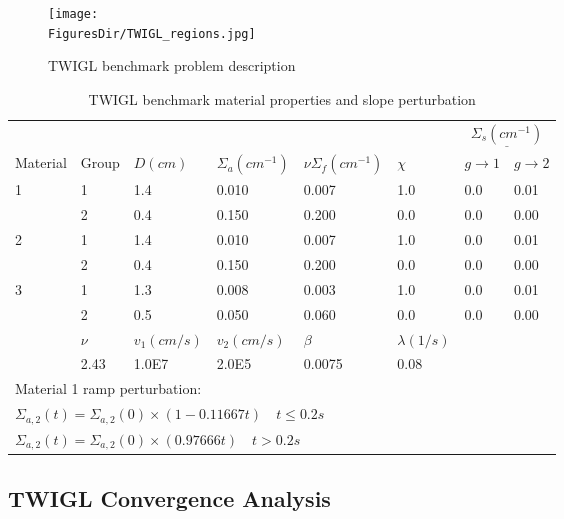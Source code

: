 \begin{figure}[!htbp]
\begin{center}
\texttt{[image: \\FiguresDir/TWIGL\_regions.jpg]}
\caption{TWIGL benchmark problem description}
\label{fig:TWIGL_reg}
\end{center}
\end{figure}
\begin{table}[!htbp]
\begin{center}
\caption{TWIGL benchmark material properties and slope perturbation}
\label{tab:TWIGL_mat}
\begin{tabular}{llllllll}
\hline
  &  &  &  &  &  &  \multicolumn{2}{c}{$\underline{\Sigma_s (cm^{-1})} $} \\
Material & Group & $D (cm)$ & $\Sigma_a (cm^{-1})$ & $\nu\Sigma_f (cm^{-1})$ & $\chi$ & $g \rightarrow 1$ & $g \rightarrow 2$ \\
\hline
1 & 1 & 1.4 & 0.010 & 0.007 & 1.0 & 0.0 & 0.01 \\
  & 2 & 0.4 & 0.150 & 0.200 & 0.0 & 0.0 & 0.00  \\
2 & 1 & 1.4 & 0.010 & 0.007 & 1.0 & 0.0 & 0.01  \\
  & 2 & 0.4 & 0.150 & 0.200 & 0.0 & 0.0 & 0.00  \\
3 & 1 & 1.3 & 0.008 & 0.003 & 1.0 & 0.0 & 0.01  \\
  & 2 & 0.5 & 0.050 & 0.060 & 0.0 & 0.0 & 0.00  \\
\hline
  & $\nu$ & $v_1 (cm/s)$ & $v_2 (cm/s)$ & $\beta$ & $\lambda (1/s)$ &   &   \\
\hline
  & 2.43 & 1.0E7 & 2.0E5 & 0.0075 & 0.08 &   &   \\
\hline
 \multicolumn{8}{l}{\footnotesize Material 1 ramp perturbation:} \\
\multicolumn{8}{l}{\footnotesize $\Sigma_{a,2}(t)=\Sigma_{a,2}(0) \times (1-0.11667t) \quad t \leq 0.2 s$} \\
\multicolumn{8}{l}{\footnotesize $\Sigma_{a,2}(t)=\Sigma_{a,2}(0) \times (0.97666t) \quad t > 0.2 s$} \normalsize
\end{tabular}
\end{center}
\end{table}

\subsection{TWIGL Convergence Analysis}


